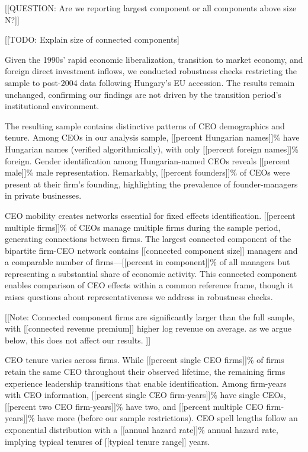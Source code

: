\documentclass[11pt,a4paper]{article}
\begin{document}


[[QUESTION: Are we reporting largest component or all components above size N?]]

[[TODO: Explain size of connected components]

Given the 1990s' rapid economic liberalization, transition to market economy, and foreign direct investment inflows, we conducted robustness checks restricting the sample to post-2004 data following Hungary's EU accession. The results remain unchanged, confirming our findings are not driven by the transition period's institutional environment.

The resulting sample contains distinctive patterns of CEO demographics and tenure. Among CEOs in our analysis sample, [[percent Hungarian names]]\% have Hungarian names (verified algorithmically), with only [[percent foreign names]]\% foreign. Gender identification among Hungarian-named CEOs reveals [[percent male]]\% male representation. Remarkably, [[percent founders]]\% of CEOs were present at their firm's founding, highlighting the prevalence of founder-managers in private businesses.

CEO mobility creates networks essential for fixed effects identification. [[percent multiple firms]]\% of CEOs manage multiple firms during the sample period, generating connections between firms. The largest connected component of the bipartite firm-CEO network contains [[connected component size]] managers and a comparable number of firms—[[percent in component]]\% of all managers but representing a substantial share of economic activity. This connected component enables comparison of CEO effects within a common reference frame, though it raises questions about representativeness we address in robustness checks.

[[Note: Connected component firms are significantly larger than the full sample, with [[connected revenue premium]] higher log revenue on average. as we argue below, this does not affect our results. ]]

CEO tenure varies across firms. While [[percent single CEO firms]]\% of firms retain the same CEO throughout their observed lifetime, the remaining firms experience leadership transitions that enable identification. Among firm-years with CEO information, [[percent single CEO firm-years]]\% have single CEOs, [[percent two CEO firm-years]]\% have two, and [[percent multiple CEO firm-years]]\% have more (before our sample restrictions). CEO spell lengths follow an exponential distribution with a [[annual hazard rate]]\% annual hazard rate, implying typical tenures of [[typical tenure range]] years.
\end{document}
